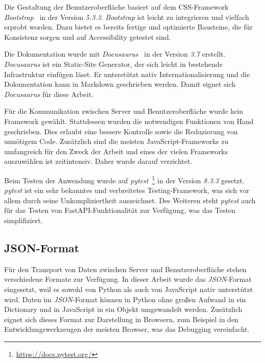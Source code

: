 Die Gestaltung der Benutzeroberfläche basiert auf dem CSS-Framework \textit{Bootstrap}~\cite{bootstrap} in der Version \textit{5.3.3}.
\textit{Bootstrap} ist leicht zu integrieren und vielfach erprobt worden. Dazu bietet es bereits fertige und optimierte Bausteine, die für Konsistenz sorgen und auf Accessibility getestet sind.

Die Dokumentation wurde mit \textit{Docusaurus}~\cite{docusaurus} in der Version \textit{3.7} erstellt. \textit{Docusaurus} ist ein Static-Site Generator, der sich leicht in
bestehende Infrastruktur einfügen lässt. Er unterstützt nativ Internationalisierung und die Dokumentation kann in Markdown geschrieben werden. Damit eignet sich \textit{Docusaurus} für diese Arbeit.

Für die Kommunikation zwischen Server und Benutzeroberfläche wurde kein Framework gewählt. Stattdessen wurden die notwendigen Funktionen von Hand geschrieben. Dies erlaubt eine bessere Kontrolle sowie die
Reduzierung von unnötigem Code. Zusätzlich sind die meisten JavaScript-Frameworks zu umfangreich für den Zweck der Arbeit und eines der vielen Frameworks auszuwählen ist zeitintensiv. Daher wurde darauf verzichtet.

Beim Testen der Anwendung wurde auf \textit{pytest}~\footnote{\hspace{1.5mm}\url{https://docs.pytest.org/}} in der Version \textit{8.3.3} gesetzt.
\textit{pytest} ist ein sehr bekanntes und verbreitetes Testing-Framework, was sich vor allem durch seine Unkompliziertheit auszeichnet.
Des Weiteren steht \textit{pytest} auch für das Testen von FastAPI-Funktionalität zur Verfügung, was das Testen simplifiziert. 

\subsection{JSON-Format}

Für den Transport von Daten zwischen Server und Benutzeroberfläche stehen verschiedene Formate zur Verfügung. In dieser Arbeit wurde das \textit{JSON}-Format eingesetzt,
weil es sowohl von Python als auch von JavaScript nativ unterstützt wird. Daten im \textit{JSON}-Format können in Python ohne großen Aufwand in ein Dictionary und in JavaScript in ein Objekt umgewandelt werden.
Zusätzlich eignet sich dieses Format zur Darstellung in Browsern, zum Beispiel in den Entwicklungswerkzeugen der meisten Browser, was das Debugging vereinfacht.


